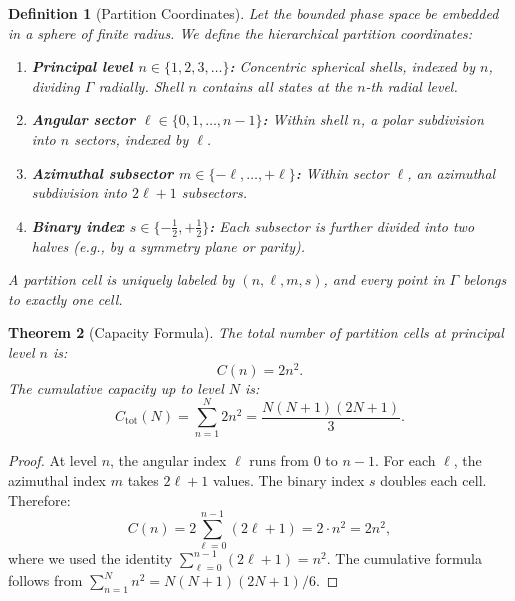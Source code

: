 \documentclass[11pt,twocolumn,a4paper]{article}
\newtheorem{theorem}{Theorem}[section]
\newtheorem{definition}[theorem]{Definition}
\begin{document}
\begin{definition}[Partition Coordinates]
\label{def:partition-coords}
Let the bounded phase space be embedded in a sphere of finite
radius. We define the hierarchical partition coordinates:
\begin{enumerate}[label=(\roman*),leftmargin=*]
\item \textbf{Principal level $n \in \{1, 2, 3, \ldots\}$:} Concentric
  spherical shells, indexed by $n$, dividing $\Gamma$ radially. Shell
  $n$ contains all states at the $n$-th radial level.
\item \textbf{Angular sector $\ell \in \{0, 1, \ldots, n-1\}$:} Within
  shell $n$, a polar subdivision into $n$ sectors, indexed by $\ell$.
\item \textbf{Azimuthal subsector $m \in \{-\ell, \ldots, +\ell\}$:}
  Within sector $\ell$, an azimuthal subdivision into $2\ell + 1$
  subsectors.
\item \textbf{Binary index $s \in \{-\tfrac{1}{2}, +\tfrac{1}{2}\}$:}
  Each subsector is further divided into two halves (e.g., by a
  symmetry plane or parity).
\end{enumerate}
A partition cell is uniquely labeled by $(n, \ell, m, s)$, and
every point in $\Gamma$ belongs to exactly one cell.
\end{definition}

\begin{theorem}[Capacity Formula]
\label{thm:capacity}
The total number of partition cells at principal level $n$ is:
\begin{equation}
C(n) = 2n^2.
\label{eq:capacity}
\end{equation}
The cumulative capacity up to level $N$ is:
\begin{equation}
C_{\mathrm{tot}}(N) = \sum_{n=1}^{N} 2n^2
  = \frac{N(N+1)(2N+1)}{3}.
\label{eq:cumulative-capacity}
\end{equation}
\end{theorem}

\begin{proof}
At level $n$, the angular index $\ell$ runs from $0$ to $n-1$. For
each $\ell$, the azimuthal index $m$ takes $2\ell + 1$ values. The
binary index $s$ doubles each cell. Therefore:
\begin{equation}
C(n) = 2 \sum_{\ell=0}^{n-1} (2\ell + 1)
  = 2 \cdot n^2 = 2n^2,
\label{eq:capacity-derivation}
\end{equation}
where we used the identity $\sum_{\ell=0}^{n-1}(2\ell+1) = n^2$.
The cumulative formula follows from $\sum_{n=1}^{N} n^2 =
N(N+1)(2N+1)/6$.
\end{proof}
\end{document}
